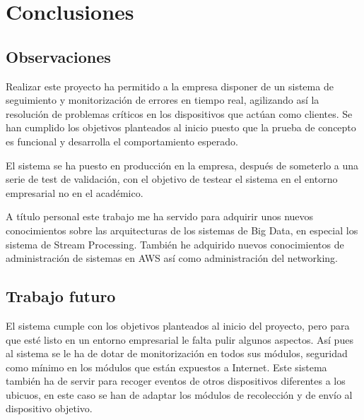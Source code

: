 \chapter{Conclusiones}

\section{Observaciones}

Realizar este proyecto ha permitido a la empresa disponer de un sistema de seguimiento y monitorización de errores en tiempo real, agilizando así la resolución de problemas críticos en los dispositivos que actúan como clientes. Se han cumplido los objetivos planteados al inicio puesto que la prueba de concepto es funcional y desarrolla el comportamiento esperado.

El sistema se ha puesto en producción en la empresa, después de someterlo a una serie de test de validación, con el objetivo de testear el sistema en el entorno empresarial no en el académico.

A título personal este trabajo me ha servido para adquirir unos nuevos conocimientos sobre las arquitecturas de los sistemas de Big Data, en especial los sistema de Stream Processing. También he adquirido nuevos conocimientos de administración de sistemas en AWS así como administración del networking.

\section{Trabajo futuro}

El sistema cumple con los objetivos planteados al inicio del proyecto, pero para que esté listo en un entorno empresarial le falta pulir algunos aspectos.
Así pues al sistema se le ha de dotar de monitorización en todos sus módulos, seguridad como mínimo en los módulos que están expuestos a Internet.
Este sistema también ha de servir para recoger eventos de otros dispositivos diferentes a los ubicuos, en este caso se han de adaptar los módulos de recolección y de envío al dispositivo objetivo.